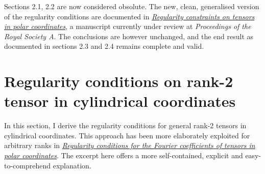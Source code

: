 \begin{commentblock}
    Sections 2.1, 2.2 are now considered obsolute. The new, clean, generalised version of the regularity conditions are documented in \href{run:../Paper_regularity/Regularity_polar_coordinates_manuscript_v3.1_submission.pdf}{\textit{Regularity constraints on tensors in polar coordinates}}, a manuscript currently under review at \textit{Proceedings of the Royal Society A}. The conclusions are however unchanged, and the end result as documented in sections 2.3 and 2.4 remains complete and valid.
\end{commentblock}

\section{Regularity conditions on rank-2 tensor in cylindrical coordinates}

In this section, I derive the regularity conditions for general rank-2 tensors in cylindrical coordinates.
This approach has been more elaborately exploited for arbitrary ranks in \href{run:./regular_tensors_polar_coordinates.pdf}{\textit{Regularity conditions for the Fourier coefficients of tensors in polar coordinates}}. The excerpt here offers a more self-contained, explicit and easy-to-comprehend explanation.

